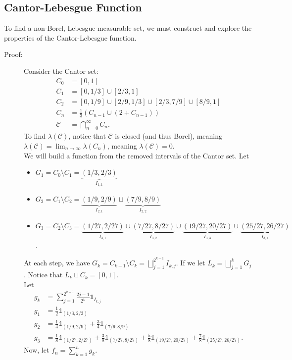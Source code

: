 \documentclass[10pt]{extarticle}
\begin{document}
  \subsection{Cantor-Lebesgue Function}%
  To find a non-Borel, Lebesgue-measurable set, we must construct and explore the properties of the Cantor-Lebesgue function.
  \begin{description}
    \item[Proof:] Consider the Cantor set:
      \begin{align*}
        C_0 &= [0,1]\\
        C_1 &= [0,1/3]\cup[2/3,1]\\
        C_2 &= [0,1/9]\cup[2/9,1/3]\cup[2/3,7/9]\cup[8/9,1]\\
        C_n &= \frac{1}{3}\left(C_{n-1}\cup (2 + C_{n-1})\right)\\
        \mathcal{C} &= \bigcap_{n=0}^{\infty} C_n.
      \end{align*}
      To find $\lambda(\mathcal{C})$, notice that $\mathcal{C}$ is closed (and thus Borel), meaning $\lambda(\mathcal{C}) = \lim_{n\rightarrow\infty} \lambda(C_n)$, meaning $\lambda(\mathcal{C}) = 0$.\\

      We will build a function from the removed intervals of the Cantor set. Let
      \begin{itemize}
        \item $\displaystyle G_1 = C_0 \setminus C_1 = \underbrace{(1/3,2/3)}_{I_{1,1}}$
        \item $\displaystyle G_2 = C_1 \setminus C_2 = \underbrace{(1/9,2/9)}_{I_{2,1}}\sqcup\underbrace{(7/9,8/9)}_{I_{2,2}}$
        \item $\displaystyle G_3 = C_2\setminus C_3 = \underbrace{(1/27,2/27)}_{I_{3,1}}\cup\underbrace{(7/27,8/27)}_{I_{3,2}}\cup\underbrace{(19/27,20/27)}_{I_{3,3}}\cup\underbrace{(25/27,26/27)}_{I_{3,4}}$.
      \end{itemize}
      At each step, we have $G_{k} = C_{k-1}\setminus C_k = \bigsqcup_{j=1}^{2^{k-1}}I_{k,j}$. If we let $L_k = \bigsqcup_{j=1}^{k}G_j$. Notice that $L_k\sqcup C_k = [0,1]$.\\

      Let
      \begin{align*}
        g_k &= \sum_{j=1}^{2^{k-1}}\frac{2j-1}{2^k}\mathbb{1}_{I_{k,j}}\\
        g_1 &= \frac{1}{2}\mathbb{1}_{(1/3,2/3)}\\
        g_2 &= \frac{1}{4}\mathbb{1}_{(1/9,2/9)} + \frac{3}{4}\mathbb{1}_{(7/9,8/9)}\\
        g_3 &= \frac{1}{8}\mathbb{1}_{(1/27,2/27)} + \frac{3}{8}\mathbb{1}_{(7/27,8/27)} + \frac{5}{8}\mathbb{1}_{(19/27,20/27)} + \frac{7}{8}\mathbb{1}_{(25/27,26/27)}.
      \end{align*}
      Now, let $f_n = \sum_{k=1}^{n}g_k$.\\


\end{description}
\end{document}
